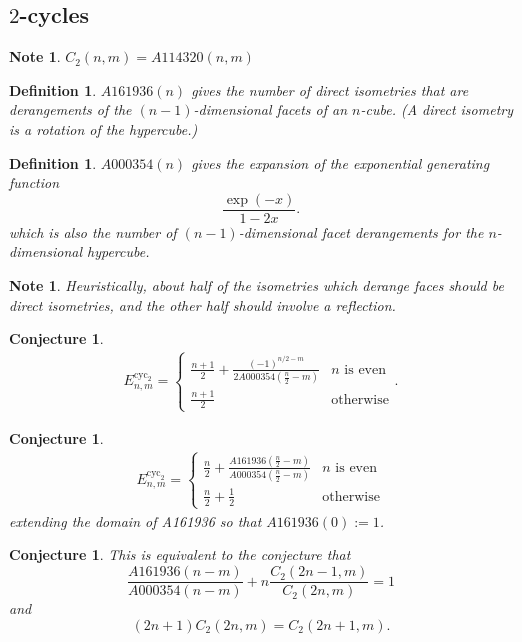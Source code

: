 \documentclass{article}
\newtheorem{definition}[theo]{Definition}
\newtheorem{conjecture}[theo]{Conjecture}
\newtheorem{note}[theo]{Note}
\begin{document}
  \subsection{$2$-cycles}
  \begin{note}
    $C_2(n,m) = A114320(n, m)$
  \end{note}
  \begin{definition}
    $A161936(n)$ gives the number of direct isometries that are derangements 
    of the $(n-1)$-dimensional facets of an $n$-cube.
    (A direct isometry is a rotation of the hypercube.)
  \end{definition}
  \begin{definition}
    $A000354(n)$ gives the expansion of the exponential generating function \[
      \frac{\exp(-x)}{1 - 2x}.
    \] which is also the number of $(n-1)$-dimensional facet derangements for 
    the $n$-dimensional hypercube.
  \end{definition}
  \begin{note}
    Heuristically, about half of the isometries which derange faces should be
    direct isometries, and the other half should involve a reflection.
  \end{note}
  \begin{conjecture}
    \begin{align}
      E_{n,m}^{\text{cyc}_2} = \begin{cases}
        \displaystyle\frac{n+1}{2} + \frac{(-1)^{n/2-m}}{2 A000354(\frac n2 - m)} & n \text{ is even}\\
        \displaystyle\frac{n+1}{2} & \text{otherwise}
      \end{cases}.
    \end{align}
  \end{conjecture}
  \begin{conjecture}
    \begin{align}
      E_{n,m}^{\text{cyc}_2} = \begin{cases}
        \displaystyle\frac n 2 + \frac{A161936(\frac n2-m)}{A000354(\frac n2-m)} & n \text{ is even}\\
        \displaystyle\frac n 2 + \frac 1 2 & \text{otherwise}
      \end{cases}
    \end{align} extending the domain of A161936 so that $A161936(0) := 1$.
  \end{conjecture}
  \begin{conjecture}
    This is equivalent to the conjecture that \begin{equation}
      \frac{A161936(n-m)}{A000354(n-m)} + n\frac{C_2(2n-1,m)}{C_2(2n,m)} = 1
    \end{equation} and \begin{equation}
      (2n+1)C_2(2n,m) = C_2(2n+1,m).
    \end{equation}
  \end{conjecture}
\end{document}
